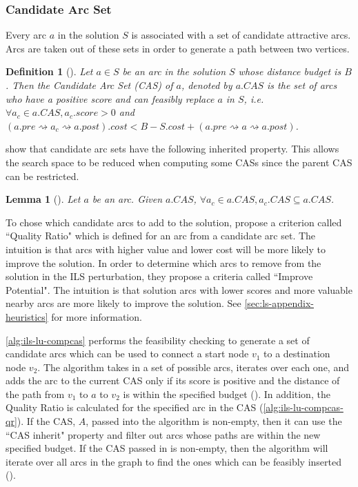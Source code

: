 \documentclass[honors]{union-cs-thesis}
\newtheorem{lemma}{Lemma}
\newtheorem{definition}{Definition}
\newcommand{\sse}{\subseteq} %
\newcommand{\spa}{\rightsquigarrow}
\begin{document}
\subsubsection{Candidate Arc Set}
Every arc $a$ in the solution $S$ is associated with a set of candidate attractive arcs. Arcs are taken out of these sets in order to generate a path between two vertices.
%
%
\begin{definition}[\cite{lu2015arc}]
    Let $a \in S$ be an arc in the solution $S$ whose distance budget is $B$. Then the Candidate Arc Set (CAS) of $a$, denoted by $a.CAS$ is the set of arcs who have a positive score and can feasibly replace $a$ in $S$, i.e. $\forall a_c \in a.CAS, a_c.score > 0$ and $(a.pre \spa a_c \spa a.post).cost < B - S.cost + (a.pre \spa a \spa a.post)$.
\end{definition}

\citeauthor{lu2015arc} show that candidate arc sets have the following inherited property. This allows the search space to be reduced when computing some CASs since the parent CAS can be restricted.
\begin{lemma}[\cite{lu2015arc}] Let $a$ be an arc. Given $a.CAS$, $\forall a_c \in a.CAS, a_c.CAS \sse a.CAS$.
\end{lemma}

To chose which candidate arcs to add to the solution, \citeauthor{lu2015arc} propose a criterion called ``Quality Ratio" which is defined for an arc from a candidate arc set. The intuition is that arcs with higher value and lower cost will be more likely to improve the solution. In order to determine which arcs to remove from the solution in the ILS perturbation, they propose a criteria called ``Improve Potential". The intuition is that solution arcs with lower scores and more valuable nearby arcs are more likely to improve the solution. See \cref{sec:ls-appendix-heuristics} for more information.

\cref{alg:ils-lu-compcas} performs the feasibility checking to generate a set of candidate arcs which can be used to connect a start node $v_1$ to a destination node $v_2$. The algorithm takes in a set of possible arcs, iterates over each one, and adds the arc to the current CAS only if its score is positive and the distance of the path from $v_1$ to $a$ to $v_2$ is within the specified budget (). In addition, the Quality Ratio is calculated for the specified arc in the CAS (\cref{alg:ils-lu-compcas-qr}). If the CAS, $A$, passed into the algorithm is non-empty, then it can use the ``CAS inherit" property and filter out arcs whose paths are within the new specified budget. If the CAS passed in is non-empty, then the algorithm will iterate over all arcs in the graph to find the ones which can be feasibly inserted ().
\end{document}
